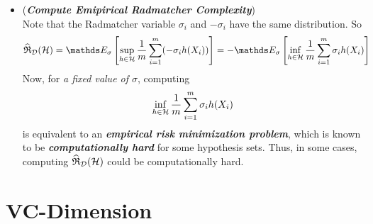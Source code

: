 \documentclass[11pt]{article}
\begin{document}
\begin{itemize}
\item \begin{remark} (\emph{\textbf{Compute Emipirical Radmatcher Complexity}})\\
Note that the Radmatcher variable $\sigma_i$ and $-\sigma_i$ have the same distribution. So
\begin{align*}
\widehat{\frR}_{\cD}(\cH)&= \E{\sigma}{\sup_{h \in \cH}\frac{1}{m}\sum_{i=1}^{m}(-\sigma_{i}h(X_i))} = -\E{\sigma}{\inf_{h \in \cH}\frac{1}{m}\sum_{i=1}^{m}\sigma_{i}h(X_i)}
\end{align*} Now, for \emph{a fixed value of $\sigma$}, computing 
\begin{align*}
\inf_{h \in {\mathcal H}}\frac{1}{m}\sum_{i=1}^{m}\sigma_{i}h(X_i)
\end{align*} is equivalent to an \emph{\textbf{empirical risk minimization problem}}, which is known to be \emph{\textbf{computationally hard}} for some hypothesis sets. Thus, in some cases, computing $\widehat{{\mathfrak R}}_{{\mathcal D}}({\mathcal H})$ could be computationally hard. 
\end{remark}
\end{itemize}

\section{VC-Dimension}
\end{document}
